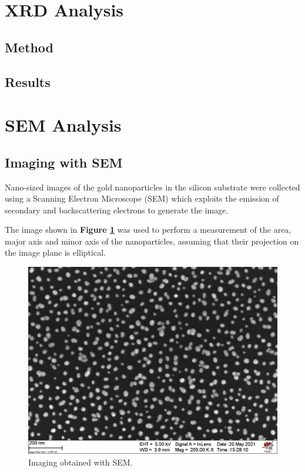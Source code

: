 \documentclass[twocolumn]{article}
\begin{document}
\begin{multicols}{2}

\section{XRD Analysis}

\label{sec:XRD}

\subsection{Method}

\subsection{Results}

\section{SEM Analysis}
\label{sec:SEM}

\subsection{Imaging with SEM}
\label{sec:synthesis}
\noindent
Nano-sized images of the gold nanoparticles in the silicon substrate were collected using a Scanning Electron Microscope (SEM) which exploits the emission of secondary and backscattering electrons to generate the image.

The image shown in \textbf{Figure \ref{fig:semss}} was used to perform a measurement of the area, major axis and minor axis of the nanoparticles, assuming that their projection on the image plane is elliptical.

\begin{figure}[H]
    \centering
    \includegraphics[width=\linewidth]{image/data/imaging.jpg}
    \caption{Imaging obtained with SEM.}
    \label{fig:semss}
\end{figure}


\end{multicols}
\end{document}
